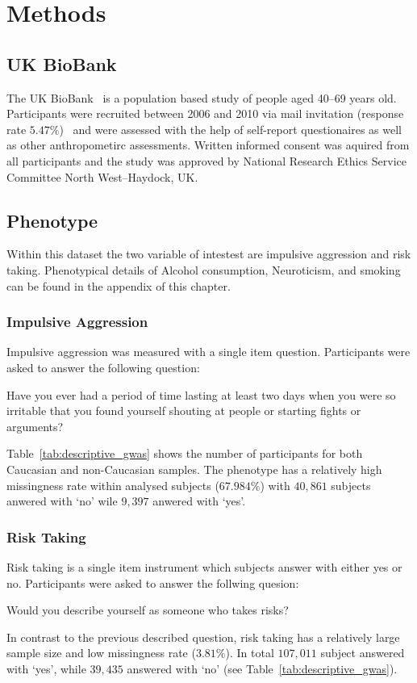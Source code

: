 \section{Methods}
\label{sec:methods}

\subsection{UK BioBank}
\label{sub:uk_biobank}
The UK BioBank~\cite{Allen2014} is a population based study of people aged 40--69 years old. 
Participants were recruited between 2006 and 2010 via mail invitation (response rate $5.47\%$)~\cite{Sudlow2015} and were assessed with the help of self-report questionaires as well as other anthropometirc assessments.
Written informed consent was aquired from all participants and the study was approved by National Research Ethics Service Committee North West–Haydock, UK\@.

\subsection{Phenotype}
\label{sub:phenotype}

Within this dataset the two variable of intestest are impulsive aggression and risk taking.
Phenotypical details of  Alcohol consumption, Neuroticism, and smoking can be found in the appendix of this chapter. 

\subsubsection{Impulsive Aggression}
\label{ssub:impulsive_aggression}
Impulsive aggression was measured with a single item question.
Participants were asked to answer the following question:
\begin{displayquote}
  Have you ever had a period of time lasting at least two days when you were so irritable that you found yourself shouting at people or starting fights or arguments?
\end{displayquote}
Table~\ref{tab:descriptive_gwas} shows the number of participants for both Caucasian and non-Caucasian samples.
The phenotype has a relatively high missingness rate within analysed subjects ($67.984\%$) with $40,861$ subjects anwered with `no' wile $9,397$ anwered with `yes'.

\subsubsection{Risk Taking}
\label{ssub:risk_taking}
Risk taking is a single item instrument which subjects answer with either yes or no.
Participants were asked to answer the follwing quesion:
\begin{displayquote}
  Would you describe yourself as someone who takes risks?
\end{displayquote}
In contrast to the previous described question, risk taking has a relatively large sample size and low missingness rate ($3.81\%$).
In total $107,011$ subject answered with `yes', while $39,435$ answered with `no' (see Table~\ref{tab:descriptive_gwas}).

